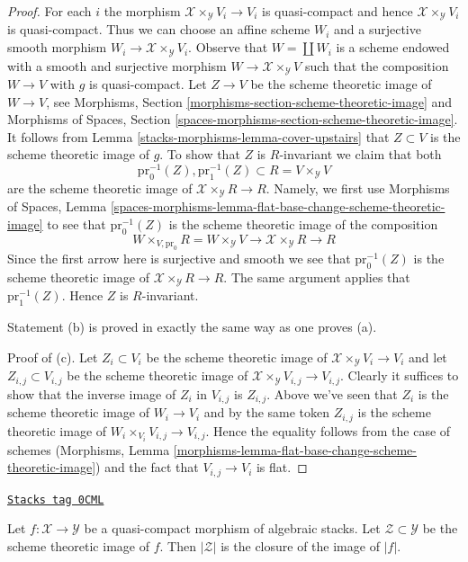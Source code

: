 \begin{proof}
\medskip\noindent
For each $i$ the morphism $\mathcal{X} \times_\mathcal{Y} V_i \to V_i$
is quasi-compact and hence $\mathcal{X} \times_\mathcal{Y} V_i$ is
quasi-compact. Thus we can choose an affine scheme $W_i$ and a
surjective smooth morphism $W_i \to \mathcal{X} \times_\mathcal{Y} V_i$.
Observe that $W = \coprod W_i$ is a scheme endowed with
a smooth and surjective morphism $W \to \mathcal{X} \times_\mathcal{Y} V$
such that the composition $W \to V$ with $g$ is quasi-compact.
Let $Z \to V$ be the scheme theoretic image of $W \to V$, see
Morphisms, Section
\ref{morphisms-section-scheme-theoretic-image} and
Morphisms of Spaces, Section
\ref{spaces-morphisms-section-scheme-theoretic-image}.
It follows from Lemma \ref{stacks-morphisms-lemma-cover-upstairs}
that $Z \subset V$ is the scheme theoretic image of $g$.
To show that $Z$ is $R$-invariant we claim that both
$$
\text{pr}_0^{-1}(Z), \text{pr}_1^{-1}(Z) \subset R = V \times_\mathcal{Y} V
$$
are the scheme theoretic image of $\mathcal{X} \times_\mathcal{Y} R \to R$.
Namely, we first use Morphisms of Spaces, Lemma
\ref{spaces-morphisms-lemma-flat-base-change-scheme-theoretic-image}
to see that $\text{pr}_0^{-1}(Z)$ is the scheme theoretic image
of the composition
$$
W \times_{V, \text{pr}_0} R = W \times_\mathcal{Y} V \to
\mathcal{X} \times_\mathcal{Y} R \to R
$$
Since the first arrow here is surjective and smooth we see that
$\text{pr}_0^{-1}(Z)$ is the scheme theoretic image of
$\mathcal{X} \times_\mathcal{Y} R \to R$. The same argument applies
that $\text{pr}_1^{-1}(Z)$. Hence $Z$ is $R$-invariant.

\medskip\noindent
Statement (b) is proved in exactly the same way as one proves (a).

\medskip\noindent
Proof of (c). Let $Z_i \subset V_i$ be the scheme theoretic image
of $\mathcal{X} \times_\mathcal{Y} V_i \to V_i$ and let
$Z_{i, j} \subset V_{i, j}$ be the scheme theoretic image of
$\mathcal{X} \times_\mathcal{Y} V_{i, j} \to V_{i, j}$.
Clearly it suffices to show that the inverse image of $Z_i$
in $V_{i, j}$ is $Z_{i, j}$. Above we've seen that
$Z_i$ is the scheme theoretic image of $W_i \to V_i$
and by the same token $Z_{i, j}$ is the scheme theoretic
image of $W_i \times_{V_i} V_{i, j} \to V_{i, j}$.
Hence the equality follows from the case of schemes
(Morphisms, Lemma
\ref{morphisms-lemma-flat-base-change-scheme-theoretic-image})
and the fact that $V_{i, j} \to V_i$ is flat.
\end{proof}

\begin{lemma}
\label{stacks-morphisms-lemma-topology-scheme-theoretic-image}
\href{https://stacks.math.columbia.edu/tag/0CML}{\texttt{Stacks tag 0CML}}

Let $f : \mathcal{X} \to \mathcal{Y}$ be a quasi-compact
morphism of algebraic stacks. Let $\mathcal{Z} \subset \mathcal{Y}$
be the scheme theoretic image of $f$. Then $|\mathcal{Z}|$
is the closure of the image of $|f|$.
\end{lemma}


